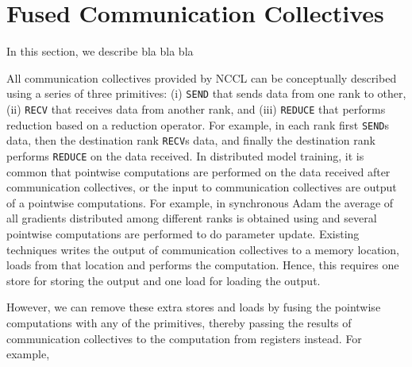 \section{Fused Communication Collectives}
In this section, we describe bla bla bla 

All communication collectives provided by NCCL can be conceptually described using a series of three primitives: (i) \texttt{SEND} that sends data from one rank to other, (ii) \texttt{RECV} that receives data from another rank, and (iii) \texttt{REDUCE} that performs reduction based on a reduction operator.
For example, in \reduce each rank first \texttt{SEND}s data, then the destination rank \texttt{RECV}s data, and finally the destination rank performs \texttt{REDUCE} on the data received.
In distributed model training, it is common that pointwise computations are performed on the data received after communication collectives, or the input to communication collectives are output of a pointwise computations.
For example, in synchronous Adam the average of all gradients distributed among different ranks is obtained using \allreduce and several pointwise computations are performed to do parameter update.
Existing techniques writes the output of communication collectives to a memory location, loads from that location and performs the computation.
Hence, this requires one store for storing the output and one load for loading the output.

However, we can remove these extra stores and loads by fusing the pointwise computations with any of the primitives, thereby passing the results of communication collectives to the computation from registers instead.
For example, 

